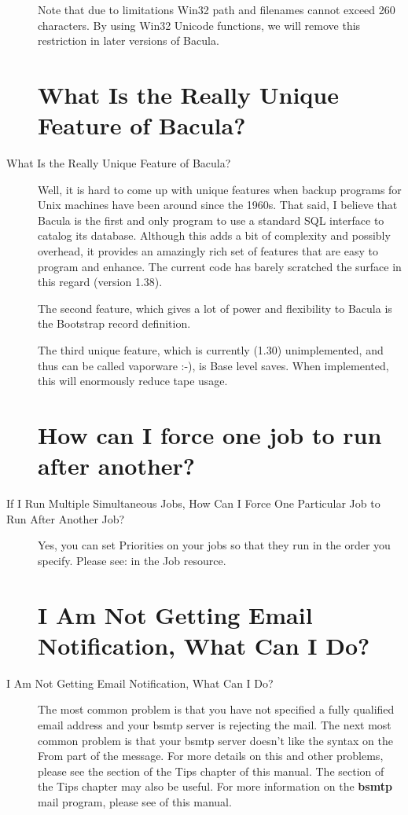 \begin{description}
   Note that due to limitations Win32 path and filenames cannot exceed
   260 characters. By using Win32 Unicode functions, we will remove this
   restriction in later versions of Bacula.

\label{unique}
\section{What Is the Really Unique Feature of Bacula?}
\item [What Is the Really Unique Feature of Bacula?]
   Well, it is hard to come up with unique features when backup programs
   for Unix machines have been around since the 1960s.  That said, I
   believe that Bacula is the first and only program to use a standard SQL
   interface to catalog its database.  Although this adds a bit of
   complexity and possibly overhead, it provides an amazingly rich set of
   features that are easy to program and enhance.  The current code has
   barely scratched the surface in this regard (version 1.38).

   The second feature, which gives a lot of power and flexibility to Bacula
   is the Bootstrap record definition.

   The third unique feature, which is currently (1.30) unimplemented, and
   thus can be called vaporware :-), is Base level saves.  When
   implemented, this will enormously reduce tape usage.

\label{sequence}
\section{How can I force one job to run after another?}
\item [If I Run Multiple Simultaneous Jobs, How Can I Force One
   Particular  Job to Run After Another Job? ]
Yes, you can set Priorities on your jobs so that they  run in the order you
specify. Please see:  
 in the  Job resource.

\label{nomail}
\section{I Am Not Getting Email Notification, What Can I Do? }
\item [I Am Not Getting Email Notification, What Can I Do? ]
   The most common problem is that you have not specified a fully qualified
   email address and your bsmtp server is rejecting the mail.  The next
   most common problem is that your bsmtp server doesn't like the syntax on
   the From part of the message.  For more details on this and other
   problems, please see the  section of the Tips chapter of this manual.  The section
    of the Tips
   chapter may also be useful.  For more information on the {\bf bsmtp}
   mail program, please see  of this manual.


\end{description}
